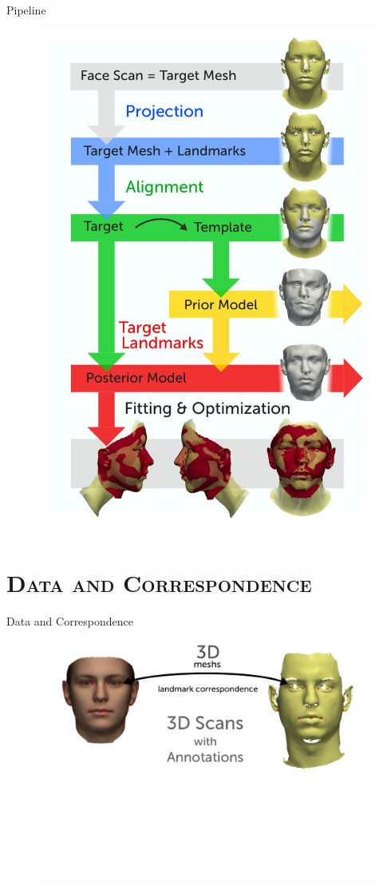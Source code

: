 \documentclass[xcolor=x11names,compress]{beamer}
\begin{document}
    \begin{frame}{Pipeline}
        \begin{figure}
            \includegraphics[width=.5\textwidth]{../resources/figures/pipeline.pdf}
        \end{figure}
    \end{frame}

    \section{\scshape Data and Correspondence}
    \begin{frame}{Data and Correspondence}
        \begin{figure}
            \includegraphics[width=.9\textwidth]{../resources/figures/givendata1.pdf}
        \end{figure}
    \end{frame}
\end{document}
